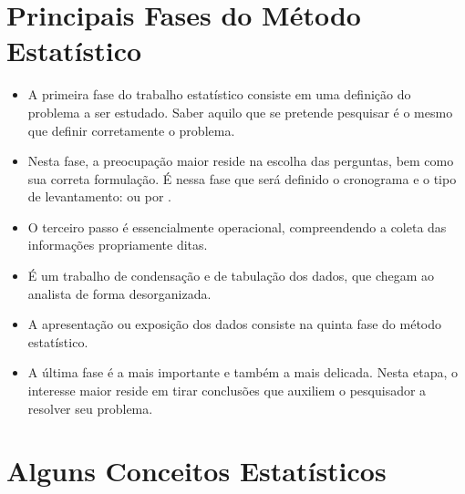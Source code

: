 \documentclass[11pt,fleqn]{book}
\numberwithin{mpicture}{chapter}
\numberwithin{mtable}{chapter}
\numberwithin{mframe}{chapter}
\begin{document}
\section{Principais Fases do Método Estatístico}
	
\begin{itemize}
	\item {} A primeira fase do trabalho estatístico consiste em uma definição do problema a ser estudado. Saber aquilo que se pretende pesquisar é o mesmo que definir corretamente o problema.

	\item {} Nesta fase, a preocupação maior reside na escolha das perguntas, bem como sua correta formulação. É nessa fase que será definido o cronograma e o tipo de levantamento:  ou por .

	\item {} O terceiro passo é essencialmente operacional, compreendendo a coleta das informações propriamente ditas.

	\item {} É um trabalho de condensação e de tabulação dos dados, que chegam ao analista de forma desorganizada.

	\item {} A apresentação ou exposição dos dados consiste na quinta fase do método estatístico.

	\item {} A última fase é a mais importante e também a mais delicada. Nesta etapa, o interesse maior reside em tirar conclusões que auxiliem o pesquisador a resolver seu problema.
\end{itemize}
	
\section{Alguns Conceitos Estatísticos}
	
\end{document}

